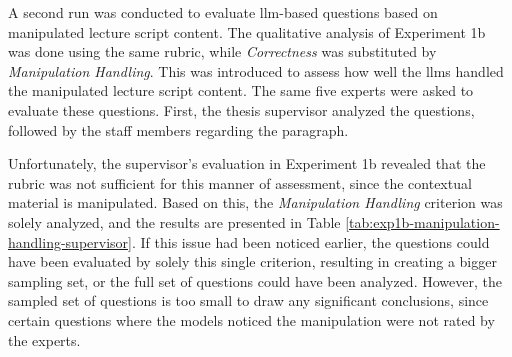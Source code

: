  A second run was conducted to evaluate \ac{llm}-based questions based on manipulated lecture script content. The qualitative analysis of Experiment 1b was done using the same rubric, while \textit{Correctness} was substituted by \textit{Manipulation Handling}. This was introduced to assess how well the \ac{llms} handled the manipulated lecture script content. The same five experts were asked to evaluate these questions. First, the thesis supervisor analyzed the questions, followed by the staff members regarding the  paragraph.

Unfortunately, the supervisor's evaluation in Experiment 1b revealed that the rubric was not sufficient for this manner of assessment, since the contextual material is manipulated. Based on this, the \textit{Manipulation Handling} criterion was solely analyzed, and the results are presented in Table \ref{tab:exp1b-manipulation-handling-supervisor}. If this issue had been noticed earlier, the questions could have been evaluated by solely this single criterion, resulting in creating a bigger sampling set, or the full set of questions could have been analyzed. However, the sampled set of questions is too small to draw any significant conclusions, since certain questions where the models noticed the manipulation were not rated by the experts.


